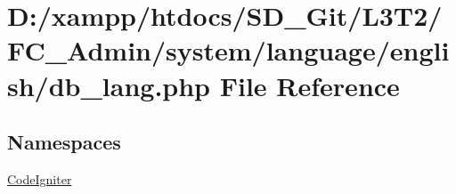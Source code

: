 \hypertarget{db__lang_8php}{}\section{D\+:/xampp/htdocs/\+S\+D\+\_\+\+Git/\+L3\+T2/\+F\+C\+\_\+\+Admin/system/language/english/db\+\_\+lang.php File Reference}
\label{db__lang_8php}
\subsection*{Namespaces}
\begin{DoxyCompactItemize}
\item 
 \hyperlink{namespace_code_igniter}{Code\+Igniter}
\end{DoxyCompactItemize}
